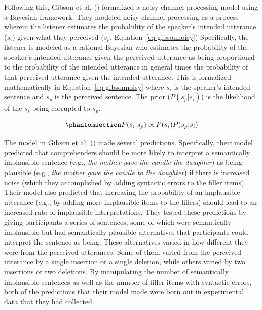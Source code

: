 \documentclass[
  12pt,
]{scrartcl}
\begin{document}
Following this, Gibson et al.
()
formalized a noisy-channel processing model using a Bayesian framework.
They modeled noisy-channel processing as a process wherein the listener
estimates the probability of the speaker's intended utterance (\(s_i\))
given what they perceived (\(s_p\), Equation~\ref{eq-gibsonnoisy})
Specifically, the listener is modeled as a rational Bayesian who
estimates the probability of the speaker's intended utterance given the
perceived utterance as being proportional to the probability of the
intended utterance in general times the probability of that perceived
utterance given the intended utterance. This is formalized
mathematically in Equation~\ref{eq-gibsonnoisy} where \(s_i\) is the
speaker's intended sentence and \(s_p\) is the perceived sentence. The
prior (\(P(s_p|s_i)\)) is the likelihood of the \(s_i\) being corrupted
to \(s_p\).

\begin{equation}\phantomsection\label{eq-gibsonnoisy}{
P(s_i|s_p)\propto P(s_i) P(s_p|s_i) 
}\end{equation}

The model in Gibson et al.
() made
several predictions. Specifically, their model predicted that
comprehenders should be more likely to interpret a semantically
implausible sentence (e.g., \emph{the mother gave the candle the
daughter}) as being plausible (e.g., \emph{the mother gave the candle to
the daughter}) if there is increased noise (which they accomplished by
adding syntactic errors to the filler items). Their model also predicted
that increasing the probability of an implausible utterance (e.g., by
adding more implausible items to the fillers) should lead to an
increased rate of implausible interpretations. They tested these
predictions by giving participants a series of sentences, some of which
were semantically implausible but had semantically plausible
alternatives that participants could interpret the sentence as being.
These alternatives varied in how different they were from the perceived
utterances. Some of them varied from the perceived utterance by a single
insertion or a single deletion, while others varied by two insertions or
two deletions. By manipulating the number of semantically implausible
sentences as well as the number of filler items with syntactic errors,
both of the predictions that their model made were born out in
experimental data that they had collected.
\end{document}
